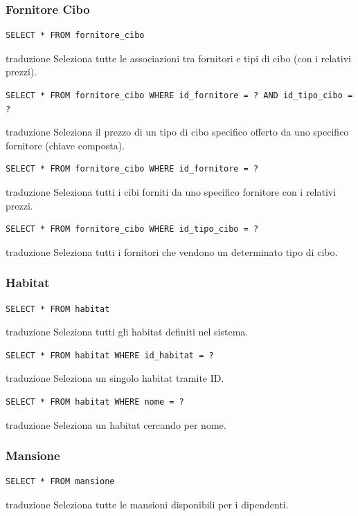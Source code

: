 \documentclass[12pt,a4paper]{report}
\begin{document}
\subsubsection*{Fornitore Cibo}
\begin{lstlisting}[style=sqlstyle]
SELECT * FROM fornitore_cibo
\end{lstlisting}
traduzione {Seleziona tutte le associazioni tra fornitori e tipi di cibo (con i relativi prezzi).}

\begin{lstlisting}[style=sqlstyle]
SELECT * FROM fornitore_cibo WHERE id_fornitore = ? AND id_tipo_cibo = ?
\end{lstlisting}
traduzione {Seleziona il prezzo di un tipo di cibo specifico offerto da uno specifico fornitore (chiave composta).}

\begin{lstlisting}[style=sqlstyle]
SELECT * FROM fornitore_cibo WHERE id_fornitore = ?
\end{lstlisting}
traduzione {Seleziona tutti i cibi forniti da uno specifico fornitore con i relativi prezzi.}

\begin{lstlisting}[style=sqlstyle]
SELECT * FROM fornitore_cibo WHERE id_tipo_cibo = ?
\end{lstlisting}
traduzione {Seleziona tutti i fornitori che vendono un determinato tipo di cibo.}

\subsubsection*{Habitat}
\begin{lstlisting}[style=sqlstyle]
SELECT * FROM habitat
\end{lstlisting}
traduzione {Seleziona tutti gli habitat definiti nel sistema.}

\begin{lstlisting}[style=sqlstyle]
SELECT * FROM habitat WHERE id_habitat = ?
\end{lstlisting}
traduzione {Seleziona un singolo habitat tramite ID.}

\begin{lstlisting}[style=sqlstyle]
SELECT * FROM habitat WHERE nome = ?
\end{lstlisting}
traduzione {Seleziona un habitat cercando per nome.}

\subsubsection*{Mansione}
\begin{lstlisting}[style=sqlstyle]
SELECT * FROM mansione
\end{lstlisting}
traduzione {Seleziona tutte le mansioni disponibili per i dipendenti.}
\end{document}
